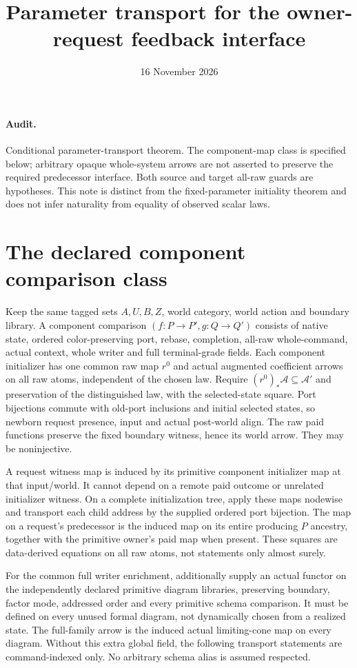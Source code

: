 \documentclass[11pt]{article}\usepackage{amsmath,amssymb,amsthm,geometry}\geometry{margin=1in}
\title{Parameter transport for the owner-request feedback interface}\date{16 November 2026}
\begin{document}
\maketitle
\paragraph{Audit.} Conditional parameter-transport theorem. The component-map class is specified below; arbitrary opaque whole-system arrows are not asserted to preserve the required predecessor interface. Both source and target all-raw guards are hypotheses. This note is distinct from the fixed-parameter initiality theorem and does not infer naturality from equality of observed scalar laws.

\section{The declared component comparison class}
Keep the same tagged sets $A,U,B,Z$, world category, world action and boundary library. A component comparison $(f:P\to P',g:Q\to Q')$ consists of native state, ordered color-preserving port, rebase, completion, all-raw whole-command, actual context, whole writer and full terminal-grade fields. Each component initializer has one common raw map $r^0$ and actual augmented coefficient arrows on all raw atoms, independent of the chosen law. Require $(r^0)_*\mathcal A\subseteq\mathcal A'$ and preservation of the distinguished law, with the selected-state square. Port bijections commute with old-port inclusions and initial selected states, so newborn request presence, input and actual post-world align. The raw paid functions preserve the fixed boundary witness, hence its world arrow. They may be noninjective.

A request witness map is induced by its primitive component initializer map at that input/world. It cannot depend on a remote paid outcome or unrelated initializer witness. On a complete initialization tree, apply these maps nodewise and transport each child address by the supplied ordered port bijection. The map on a request's predecessor is the induced map on its entire producing $P$ ancestry, together with the primitive owner's paid map when present. These squares are data-derived equations on all raw atoms, not statements only almost surely.

For the common full writer enrichment, additionally supply an actual functor on the independently declared primitive diagram libraries, preserving boundary, factor mode, addressed order and every primitive schema comparison. It must be defined on every unused formal diagram, not dynamically chosen from a realized state. The full-family arrow is the induced actual limiting-cone map on every diagram. Without this extra global field, the following transport statements are command-indexed only. No arbitrary schema alias is assumed respected.
\end{document}
